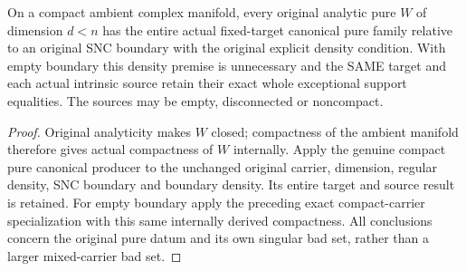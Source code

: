 \begin{theorem}
\label{hir:original-pure-compact-ambient-canonical-specialization}
\leanok
On a compact ambient complex manifold, every original analytic pure
$W$ of dimension $d<n$ has the entire actual fixed-target canonical
pure family relative to an original SNC boundary with the original
explicit density condition. With empty boundary this density premise
is unnecessary and the SAME target and each actual intrinsic source
retain their exact whole exceptional support equalities. The sources
may be empty, disconnected or noncompact.
\end{theorem}
\begin{proof}
Original analyticity makes $W$ closed; compactness of the ambient
manifold therefore gives actual compactness of $W$ internally.
Apply the genuine compact pure canonical producer to the unchanged
original carrier, dimension, regular density, SNC boundary and
boundary density. Its entire target and source result is retained.
For empty boundary apply the preceding exact compact-carrier
specialization with this same internally derived compactness.
All conclusions concern the original pure datum and its own singular
bad set, rather than a larger mixed-carrier bad set.
\end{proof}
